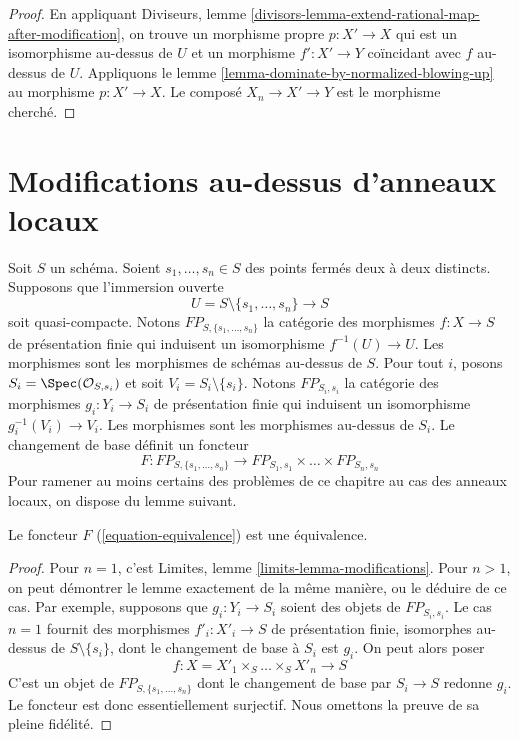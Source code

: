 \begin{proof} En appliquant Diviseurs, lemme \ref{divisors-lemma-extend-rational-map-after-modification}, on trouve un morphisme propre $p : X' \to X$ qui est un isomorphisme au-dessus de $U$ et un morphisme $f' : X' \to Y$ coïncidant avec $f$ au-dessus de $U$. Appliquons le lemme \ref{lemma-dominate-by-normalized-blowing-up} au morphisme $p : X' \to X$. Le composé $X_n \to X' \to Y$ est le morphisme cherché. \end{proof}





\section{Modifications au-dessus d'anneaux locaux} \label{section-modifications}

\noindent Soit $S$ un schéma. Soient $s_1, \ldots, s_n \in S$ des points fermés deux à deux distincts. Supposons que l'immersion ouverte $$
U = S \setminus \{s_1, \ldots, s_n\} \longrightarrow S
$$ soit quasi-compacte. Notons $FP_{S, \{s_1, \ldots, s_n\}}$ la catégorie des morphismes $f : X \to S$ de présentation finie qui induisent un isomorphisme $f^{-1}(U) \to U$. Les morphismes sont les morphismes de schémas au-dessus de $S$. Pour tout $i$, posons $S_i = \Spec(\mathcal{O}_{S, s_i})$ et soit $V_i = S_i \setminus \{s_i\}$. Notons $FP_{S_i, s_i}$ la catégorie des morphismes $g_i : Y_i \to S_i$ de présentation finie qui induisent un isomorphisme $g_i^{-1}(V_i) \to V_i$. Les morphismes sont les morphismes au-dessus de $S_i$. Le changement de base définit un foncteur \begin{equation}
\label{equation-equivalence}
F :
FP_{S, \{s_1, \ldots, s_n\}}
\longrightarrow
FP_{S_1, s_1} \times \ldots \times FP_{S_n, s_n}
\end{equation} Pour ramener au moins certains des problèmes de ce chapitre au cas des anneaux locaux, on dispose du lemme suivant.

\begin{lemma} \label{lemma-equivalence} Le foncteur $F$ (\ref{equation-equivalence}) est une équivalence. \end{lemma}

\begin{proof} Pour $n = 1$, c'est Limites, lemme \ref{limits-lemma-modifications}. Pour $n > 1$, on peut démontrer le lemme exactement de la même manière, ou le déduire de ce cas. Par exemple, supposons que $g_i : Y_i \to S_i$ soient des objets de $FP_{S_i, s_i}$. Le cas $n = 1$ fournit des morphismes $f'_i : X'_i \to S$ de présentation finie, isomorphes au-dessus de $S \setminus \{s_i\}$, dont le changement de base à $S_i$ est $g_i$. On peut alors poser $$
f : X = X'_1 \times_S \ldots \times_S X'_n \to S
$$ C'est un objet de $FP_{S, \{s_1, \ldots, s_n\}}$ dont le changement de base par $S_i \to S$ redonne $g_i$. Le foncteur est donc essentiellement surjectif. Nous omettons la preuve de sa pleine fidélité. \end{proof}

